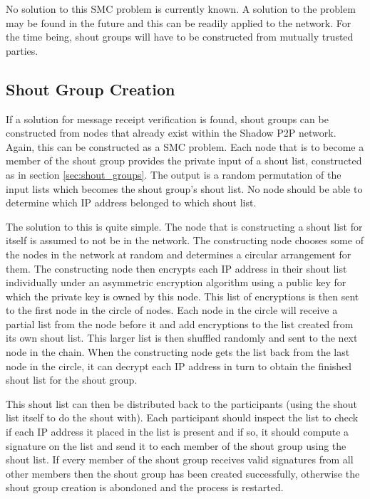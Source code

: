 \documentclass[ %
                    author={Luke Murray},
                supervisor={Dr. Simon Hollis},
                     title={Shadow Peer-to-Peer Networks},
                  subtitle={},
                    degree={MEng},
                      year={2013} ]{thesis}
\begin{document}
No solution to this SMC problem is currently known. A solution to the problem may be found in the future and this can be readily applied to the network. For the time being, shout groups will have to be constructed from mutually trusted parties.


\subsection{Shout Group Creation}

If a solution for message receipt verification is found, shout groups can be constructed from nodes that already exist within the Shadow P2P network. Again, this can be constructed as a SMC problem. Each node that is to become a member of the shout group provides the private input of a shout list, constructed as in section \ref{sec:shout_groups}. The output is a random permutation of the input lists which becomes the shout group's shout list. No node should be able to determine which IP address belonged to which shout list.

The solution to this is quite simple. The node that is constructing a shout list for itself is assumed to not be in the network. The constructing node chooses some of the nodes in the network at random and determines a circular arrangement for them. The constructing node then encrypts each IP address in their shout list individually under an asymmetric encryption algorithm using a public key for which the private key is owned by this node. This list of encryptions is then sent to the first node in the circle of nodes. Each node in the circle will receive a partial list from the node before it and add encryptions to the list created from its own shout list. This larger list is then shuffled randomly and sent to the next node in the chain. When the constructing node gets the list back from the last node in the circle, it can decrypt each IP address in turn to obtain the finished shout list for the shout group.

This shout list can then be distributed back to the participants (using the shout list itself to do the shout with). Each participant should inspect the list to check if each IP address it placed in the list is present and if so, it should compute a signature on the list and send it to each member of the shout group using the shout list. If every member of the shout group receives valid signatures from all other members then the shout group has been created successfully, otherwise the shout group creation is abondoned and the process is restarted.
\end{document}
